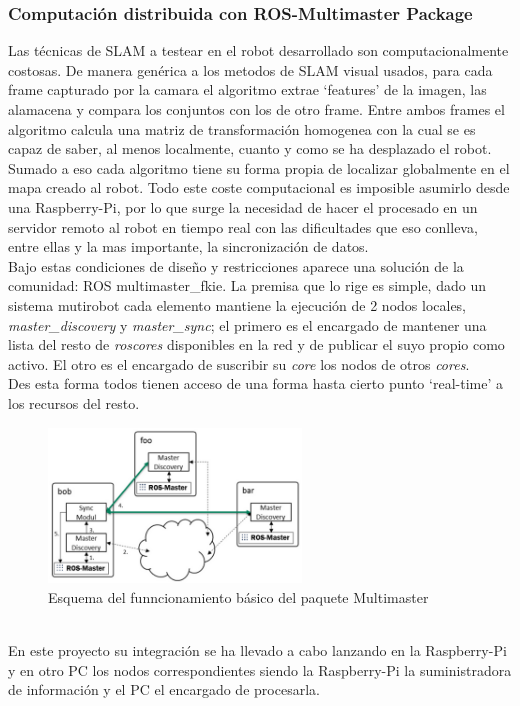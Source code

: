 \subsubsection{Computación distribuida con ROS-Multimaster Package}
Las técnicas de SLAM a testear en el robot desarrollado son computacionalmente costosas. De manera genérica a los metodos de SLAM visual usados, 
para cada frame capturado por la camara el algoritmo extrae `features' de la imagen, las alamacena y compara los conjuntos con los de otro frame. 
Entre ambos frames el algoritmo calcula una matriz de transformación homogenea con la cual se es capaz de saber, al menos localmente, cuanto y como se ha
desplazado el robot. Sumado a eso cada algoritmo tiene su forma propia de localizar globalmente en el mapa creado al robot. Todo este coste computacional es
imposible asumirlo desde una Raspberry-Pi, por lo que surge la necesidad de hacer el procesado en un servidor remoto al robot en tiempo real con las 
dificultades que eso conlleva, entre ellas y la mas importante, la sincronización de datos.\\
Bajo estas condiciones de diseño y restricciones aparece una solución de la comunidad: ROS multimaster\_fkie. La premisa que lo rige es simple, dado un sistema mutirobot
cada elemento mantiene la ejecución de 2 nodos locales, \textit{master\_discovery} y \textit{master\_sync}; el primero es el encargado de mantener una lista del resto 
de \textit{roscores} disponibles en la red y de publicar el suyo propio como activo. El otro es el encargado de suscribir su \textit{core} los nodos de otros \textit{cores}.\\
Des esta forma todos tienen acceso de una forma hasta cierto punto `real-time' a los recursos del resto. 
\begin{figure}[!ht]
    \centering
    \includegraphics[width=0.6\textwidth]{images/ros_multimaster.png}
    \caption{Esquema del funncionamiento básico del paquete Multimaster}
\end{figure}\\
En este proyecto su integración se ha llevado a cabo lanzando en la Raspberry-Pi y en otro PC los nodos correspondientes siendo la Raspberry-Pi la 
suministradora de información y el PC el encargado de procesarla.
